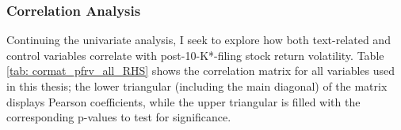 
\subsubsection{Correlation Analysis}
\label{sssec: results_correls_rhs}
Continuing the univariate analysis, I seek to explore how both text-related and control variables correlate with post-10-K*-filing stock return volatility. Table \ref{tab: cormat_pfrv_all_RHS} shows the correlation matrix for all variables used in this thesis; the lower triangular (including the main diagonal) of the matrix displays Pearson coefficients, while the upper triangular is filled with the corresponding p-values to test for significance.

